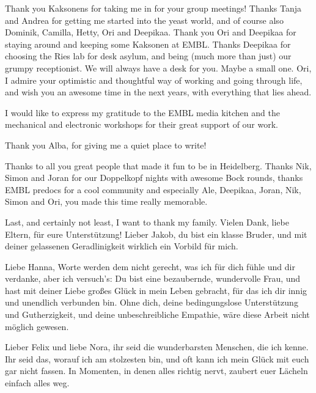 \documentclass[
11pt, %
ngerman,
english, %
onehalfspacing,
hidelinks,
toctotoc, %
headsepline, %
]{MastersDoctoralThesis} %
\begin{document}
\begin{acknowledgements}
Thank you Kaksonens for taking me in for your group meetings! Thanks Tanja and Andrea for getting me started into the yeast world, and of course also Dominik, Camilla, Hetty, Ori and Deepikaa. Thank you Ori and Deepikaa for staying around and keeping some Kaksonen at EMBL. Thanks Deepikaa for choosing the Ries lab for desk asylum, and being (much more than just) our grumpy receptionist. We will always have a desk for you. Maybe a small one. Ori, I admire your optimistic and thoughtful way of working and going through life, and wish you an awesome time in the next years, with everything that lies ahead.

I would like to express my gratitude to the EMBL media kitchen and the mechanical and electronic workshops for their great support of our work.

Thank you Alba, for giving me a quiet place to write!

Thanks to all you great people that made it fun to be in Heidelberg. Thanks Nik, Simon and Joran for our Doppelkopf nights with awesome Bock rounds, thanks EMBL predocs for a cool community and especially Ale, Deepikaa, Joran, Nik, Simon and Ori, you made this time really memorable.

\vspace{\baselineskip}

Last, and certainly not least, I want to thank my family. Vielen Dank, liebe Eltern, für eure Unterstützung! Lieber Jakob, du bist ein klasse Bruder, und mit deiner gelassenen Geradlinigkeit wirklich ein Vorbild für mich.

\vspace{\baselineskip}

Liebe Hanna, Worte werden dem nicht gerecht, was ich für dich fühle und dir verdanke, aber ich versuch's: Du bist eine bezaubernde, wundervolle Frau, und hast mit deiner Liebe großes Glück in mein Leben gebracht, für das ich dir innig und unendlich verbunden bin. Ohne dich, deine bedingungslose Unterstützung und Gutherzigkeit, und deine unbeschreibliche Empathie, wäre diese Arbeit nicht möglich gewesen.

\vspace{\baselineskip}

Lieber Felix und liebe Nora, ihr seid die wunderbarsten Menschen, die ich kenne. Ihr seid das, worauf ich am stolzesten bin, und oft kann ich mein Glück mit euch gar nicht fassen. In Momenten, in denen alles richtig nervt, zaubert euer Lächeln einfach alles weg.



\end{acknowledgements}
\end{document}
